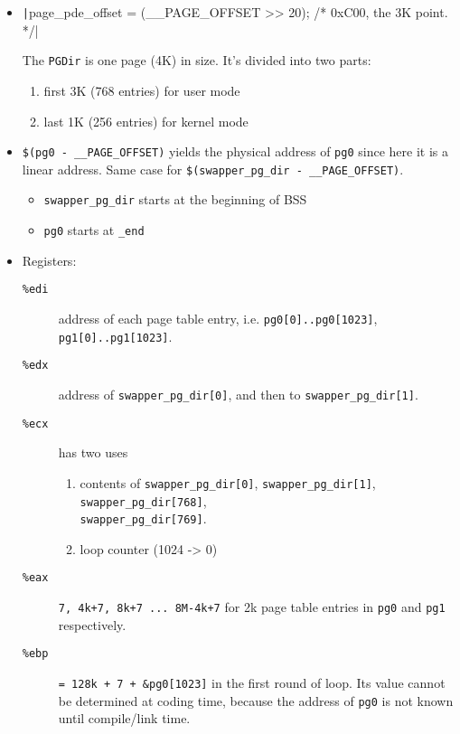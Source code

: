 \begin{itemize}
\item \texttt|page_pde_offset = (__PAGE_OFFSET >> 20); /* 0xC00, the 3K point. */|
    
  The \texttt{PGDir} is one page (4K) in size. It's divided into two parts:
  \begin{enumerate}
  \item first 3K (768 entries) for user mode
  \item last 1K (256 entries) for kernel mode
  \end{enumerate}
\item \texttt{\$(pg0 - \_\_PAGE\_OFFSET)} yields the physical address of \texttt{pg0}
  since here it is a linear address. Same case for \texttt{\$(swapper\_pg\_dir -
    \_\_PAGE\_OFFSET)}.
  \begin{itemize}
  \item \texttt{swapper\_pg\_dir} starts at the beginning of BSS
  \item \texttt{pg0} starts at \texttt{\_end}
  \end{itemize}
\item Registers:
  \begin{description}
  \item[\texttt{\%edi}] address of each page table entry, i.e. \texttt{pg0[0]..pg0[1023]},
    \texttt{pg1[0]..pg1[1023]}.
  \item[\texttt{\%edx}] address of \texttt{swapper\_pg\_dir[0]}, and then to
    \texttt{swapper\_pg\_dir[1]}.
  \item[\texttt{\%ecx}] has two uses
    \begin{enumerate}
    \item contents of \texttt{swapper\_pg\_dir[0]}, \texttt{swapper\_pg\_dir[1]},
      \texttt{swapper\_pg\_dir[768]},\\ \texttt{swapper\_pg\_dir[769]}.
    \item loop counter (1024 -> 0)
    \end{enumerate}
  \item[\texttt{\%eax}] \texttt{7, 4k+7, 8k+7 ... 8M-4k+7} for 2k page table entries in
    \texttt{pg0} and \texttt{pg1} respectively.
  \item[\texttt{\%ebp}] \texttt{= 128k + 7 + \&pg0[1023]} in the first round of loop. Its
    value cannot be determined at coding time, because the address of \texttt{pg0} is
    not known until compile/link time.

\end{description}
\end{itemize}
